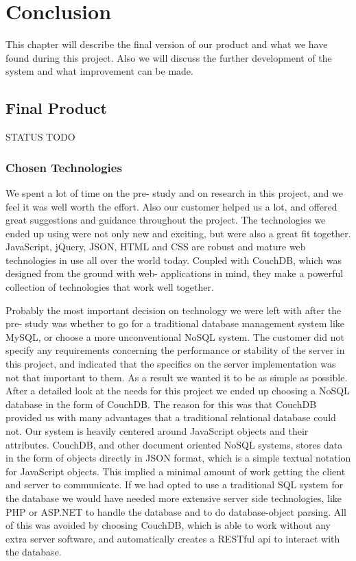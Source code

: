
\chapter{Conclusion}

\minitoc

This chapter will describe the final version of our product and what we have found during this project. Also we will discuss the further development of the system and what improvement can be made.

\clearpage

\section{Final Product}
STATUS
TODO

\subsection{Chosen Technologies}
We spent a lot of time on the pre- study and on research in this project, and we feel it was well worth the effort. Also our customer helped us a lot, and offered great suggestions and guidance throughout the project. The technologies we ended up using were not only new and exciting, but were also a great fit together. JavaScript, jQuery, JSON, HTML and CSS are robust and mature web technologies in use all over the world today. Coupled with CouchDB, which was designed from the ground with web- applications in mind, they make a powerful collection of technologies that work well together.

Probably the most important decision on technology we were left with after the pre- study was whether to go for a traditional database management system like MySQL, or choose a more unconventional NoSQL system. The customer did not specify any requirements concerning the performance or stability of the server in this project, and indicated that the specifics on the server implementation was not that important to them. As a result we wanted it to be as simple as possible. After a detailed look at the needs for this project we ended up choosing a NoSQL database in the form of CouchDB. The reason for this was that CouchDB provided us with many advantages that a traditional relational database could not. Our system is heavily centered around JavaScript objects and their attributes. CouchDB, and other document oriented NoSQL systems, stores data in the form of objects directly in JSON format, which is a simple textual notation for JavaScript objects. This implied a minimal amount of work getting the client and server to communicate. If we had opted to use a traditional SQL system for the database we would have needed more extensive server side technologies, like PHP or ASP.NET to handle the database and to do database-object parsing. All of this was avoided by choosing CouchDB, which is able to work without any extra server software, and automatically creates a RESTful api to interact with the database.



